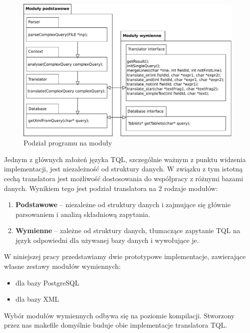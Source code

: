 \begin{figure}
 \centering
 \includegraphics[width=500px]{../diagramy/pakiety.pdf}
 \caption{Podział programu na moduły}
\end{figure}
Jednym z głównych założeń języka TQL, szczególnie ważnym z punktu widzenia implementacji, jest niezależność od struktury danych.
W związku z tym istotną cechą translatora jest możliwość dostosowania do współpracy z różnymi bazami danych.
 Wynikiem tego jest podział translatora na 2 rodzaje modułów:
\begin{enumerate}
 \item \textbf{Podstawowe} -- niezależne od struktury danych i zajmujące się głównie parsowaniem i analizą składniową zapytania.
 \item \textbf{Wymienne} -- zależne od struktury danych, tłumaczące zapytanie TQL na język odpowiedni dla używanej bazy danych
i wywołujące je.
\end{enumerate}
 W niniejszej pracy przedstawiamy dwie prototypowe implementacje, zawierające własne zestawy modułów wymiennych:
  \begin{itemize}
   \item dla bazy PostgreSQL
   \item dla bazy XML
  \end{itemize}
  Wybór modułów wymiennych odbywa się na poziomie kompilacji. Stworzony przez nas makefile domyślnie buduje obie implementacje translatora TQL.


